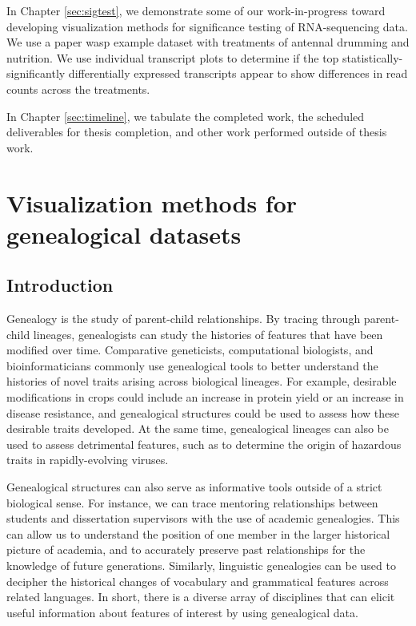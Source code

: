 \documentclass[11pt,a4paper,oldfontcommands,openany]{memoir}
\numberwithin{equation}{section} %
\begin{document}
In Chapter \ref{sec:sigtest}, we demonstrate some of our work-in-progress toward developing visualization methods for significance testing of RNA-sequencing data. We use a paper wasp example dataset with treatments of antennal drumming and nutrition. We use individual transcript plots to determine if the top statistically-significantly differentially expressed transcripts appear to show differences in read counts across the treatments.

In Chapter \ref{sec:timeline}, we tabulate the completed work, the scheduled deliverables for thesis completion, and other work performed outside of thesis work.



 
\chapter{Visualization methods for genealogical datasets}
\label{sec:ggenealogy}

\section{Introduction}

Genealogy is the study of parent-child relationships. By tracing through parent-child lineages, genealogists can study the histories of features that have been modified over time. Comparative geneticists, computational biologists, and bioinformaticians commonly use genealogical tools to better understand the histories of novel traits arising across biological lineages. For example, desirable modifications in crops could include an increase in protein yield or an increase in disease resistance, and genealogical structures could be used to assess how these desirable traits developed. At the same time, genealogical lineages can also be used to assess detrimental features, such as to determine the origin of hazardous traits in rapidly-evolving viruses.

Genealogical structures can also serve as informative tools outside of a strict biological sense. For instance, we can trace mentoring relationships between students and dissertation supervisors with the use of academic genealogies. This can allow us to understand the position of one member in the larger historical picture of academia, and to accurately preserve past relationships for the knowledge of future generations. Similarly, linguistic genealogies can be used to decipher the historical changes of vocabulary and grammatical features across related languages. In short, there is a diverse array of disciplines that can elicit useful information about features of interest by using genealogical data.
\end{document}
